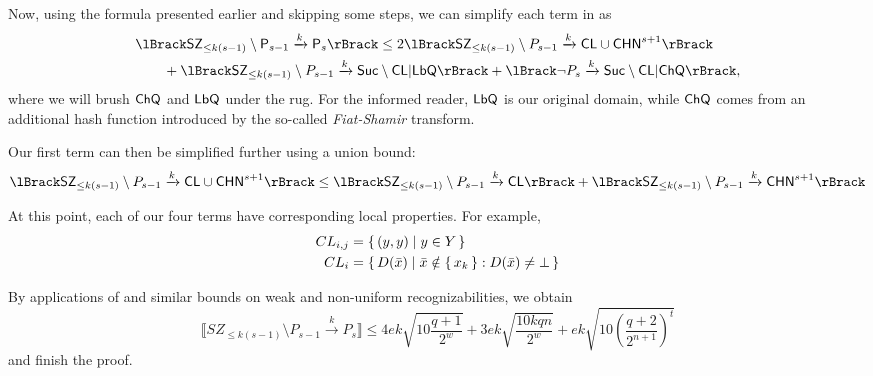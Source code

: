 Now, using the formula presented earlier and skipping some steps,
we can simplify each term in  as
\begin{align*}
	&\lBrack \SZ_{\leq k(s-1)}\setminus \sfP_{s-1}\xrightarrow{k} \sfP_s\rBrack 
	\leq
	2\lBrack \SZ_{\leq k(s-1)}\setminus P_{s-1}\xrightarrow{k} \CL\cup \CHN^{s+1}\rBrack  \\
	&\qquad+\lBrack \SZ_{\leq k(s-1)}\setminus P_{s-1}\xrightarrow{k} \Suc\setminus{\CL} | \LbQ\rBrack 
	+\lBrack \neg P_s\xrightarrow{k} \Suc\setminus\CL|\ChQ\rBrack,
\end{align*}
where we will brush $\mathsf{ChQ}$ and $\mathsf{LbQ}$ under the rug.
For the informed reader, $\mathsf{LbQ}$ is our original domain, while $\mathsf{ChQ}$ comes from an additional hash function introduced by the so-called \emph{Fiat-Shamir} transform.

Our first term can then be simplified further using a union bound:
\begin{align*}
	\lBrack \SZ_{\leq k(s-1)}\setminus P_{s-1}\xrightarrow{k} \CL\cup \CHN^{s+1}\rBrack
	\leq
	\lBrack \SZ_{\leq k(s-1)}\setminus P_{s-1}\xrightarrow{k} \CL\rBrack
	+
	\lBrack \SZ_{\leq k(s-1)}\setminus P_{s-1}\xrightarrow{k} \CHN^{s+1}\rBrack
\end{align*}

At this point, each of our four terms have corresponding local properties. For example,
\begin{align*}
	CL_{i,j}&=\set{(y, y)|y\in Y}\\
	CL_i&=\set{D(\bar{x})|\bar{x}\notin\set{x_k}:D(\bar{x})\ne\bot}
\end{align*}

By applications of  and similar bounds on weak and non-uniform recognizabilities,
we obtain
$$
\lBrack SZ_{\leq k(s-1)}\setminus P_{s-1}\xrightarrow{k} P_s\rBrack
	\leq 4ek\sqrt{10\frac{q+1}{2^w}}
	+3ek\sqrt{\frac{10kqn}{2^w}}
	+ek\sqrt{10\left(\frac{q+2}{2^{n+1}}\right)^t}
$$
and finish the proof.

